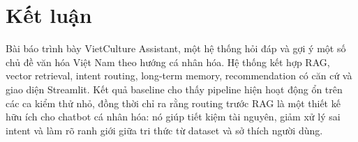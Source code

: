 \documentclass[11pt]{article}
\begin{document}
\section{Kết luận}

Bài báo trình bày VietCulture Assistant, một hệ thống hỏi đáp và gợi ý một số chủ đề văn hóa Việt Nam theo hướng cá nhân hóa. Hệ thống kết hợp RAG, vector retrieval, intent routing, long-term memory, recommendation có căn cứ và giao diện Streamlit. Kết quả baseline cho thấy pipeline hiện hoạt động ổn trên các ca kiểm thử nhỏ, đồng thời chỉ ra rằng routing trước RAG là một thiết kế hữu ích cho chatbot cá nhân hóa: nó giúp tiết kiệm tài nguyên, giảm xử lý sai intent và làm rõ ranh giới giữa tri thức từ dataset và sở thích người dùng.



\end{document}
